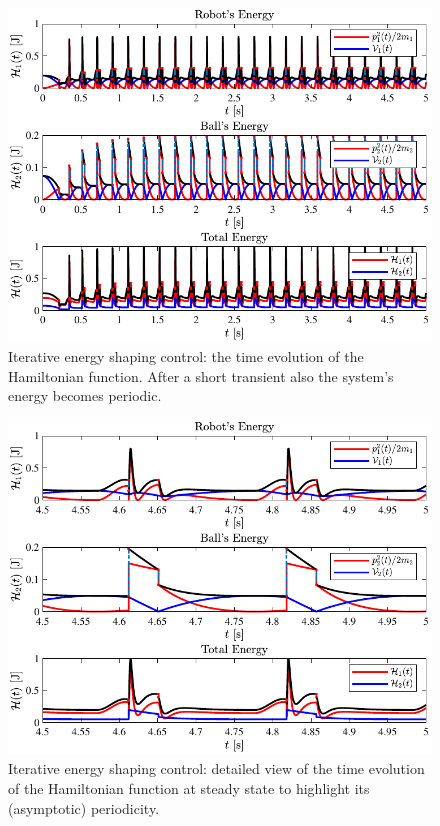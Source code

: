 \begin{figure}[!h]
	\centering
	\includegraphics[width=\linewidth]{Figures/ctrl4.pdf}
	\caption{Iterative energy shaping control: the time evolution of the Hamiltonian function. After a short transient also the system's energy becomes periodic.}
	\label{fig:ctrl4}
\end{figure}
%
\begin{figure}[!h]
	\centering
	\includegraphics[width=\linewidth]{Figures/ctrl4_det.pdf}
	\caption{Iterative energy shaping control: detailed view of the time evolution of the Hamiltonian function at steady state to highlight its (asymptotic) periodicity.}
	\label{fig:ctrl4_det}
\end{figure}
